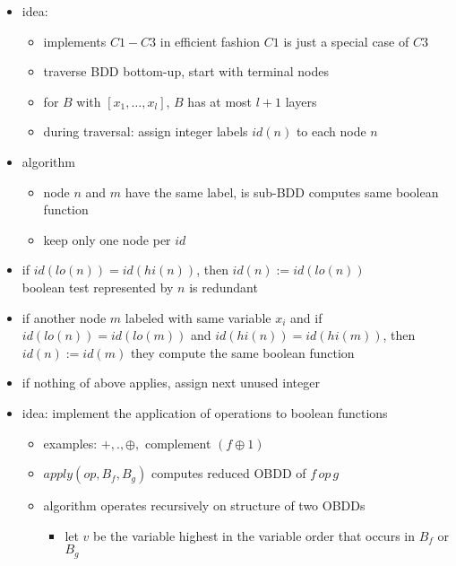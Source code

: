 \documentclass[a4paper, 10pt]{article}
\begin{document}
\begin{mdframed}
\begin{itemize}
\end{itemize}
\begin{itemize}
    \item idea:
    \begin{itemize}
        \item implements $C1-C3$ in efficient fashion {\tiny $C1$ is just a special case of $C3$}
        \item traverse BDD bottom-up, start with terminal nodes
        \item for $B$ with $[x_1,\dots,x_l]$, $B$ has at most $l+1$ layers
        \item during traversal: assign integer labels $id(n)$ to each node $n$
    \end{itemize}
    \item algorithm
    \begin{itemize}
        \item node $n$ and $m$ have the same label, is sub-BDD computes same boolean function
        \item keep only one node per $id$
    \end{itemize}
    \begin{center}
    \scalebox{1}{}
    \end{center}
    \item if $id(lo(n)) = id(hi(n))$, then $id(n):=id(lo(n))$ \\
    boolean test represented by $n$ is redundant
    \item if another node $m$ labeled with same variable $x_i$ and if $id(lo(n))=id(lo(m))$ and $id(hi(n))=id(hi(m))$, then $id(n):=id(m)$ \follows they compute the same boolean function
    \item if nothing of above applies, assign next unused integer
\end{itemize}
\begin{itemize}
    \item idea: implement the application of operations to boolean functions
    \begin{itemize}
        \item examples: $+,.,\oplus,$ complement $(f\oplus 1)$
        \item $apply(op,B_f,B_g)$ computes reduced OBDD of $f \, op \, g$
        \item algorithm operates recursively on structure of two OBDDs
        \begin{itemize}
            \item let $v$ be the variable highest in the variable order that occurs in $B_f$ or $B_g$

\end{itemize}
\end{itemize}
\end{itemize}
\end{mdframed}
\end{document}
